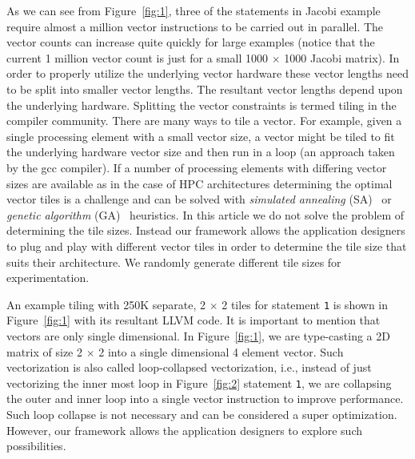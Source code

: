 As we can see from Figure~\ref{fig:1}, three of the statements in Jacobi
example require almost a million vector instructions to be carried out
in parallel. The vector counts can increase quite quickly for large
examples (notice that the current 1 million vector count is just for a
small 1000 $\times$ 1000 Jacobi matrix). In order to properly utilize
the underlying vector hardware these vector lengths need to be split
into smaller vector lengths. The resultant vector lengths depend upon
the underlying hardware. Splitting the vector constraints is termed
tiling in the compiler community. There are many ways to tile a
vector. For example, given a single processing element with a small
vector size, a vector might be tiled to fit the underlying hardware
vector size and then run in a loop (an approach taken by the gcc
compiler). If a number of processing elements with differing vector
sizes are available as in the case of HPC architectures determining the
optimal vector tiles is a challenge and can be solved with
\textit{simulated annealing} (SA)~\cite{tbra01} or \textit{genetic
  algorithm} (GA)~\cite{tbra01} heuristics. In this article we do not
solve the problem of determining the tile sizes. Instead our framework
allows the application designers to plug and play with different vector
tiles in order to determine the tile size that suits their
architecture. We randomly generate different tile sizes for
experimentation.

An example tiling with 250K separate, 2 $\times$ 2 tiles for statement
\texttt{1} is shown in Figure~\ref{fig:1} with its resultant LLVM
code. It is important to mention that vectors are only single
dimensional. In Figure~\ref{fig:1}, we are type-casting a 2D matrix of
size 2 $\times$ 2 into a single dimensional 4 element vector. Such
vectorization is also called loop-collapsed vectorization, i.e., instead
of just vectorizing the inner most loop in Figure~\ref{fig:2} statement
\texttt{1}, we are collapsing the outer and inner loop into a single
vector instruction to improve performance. Such loop collapse is not
necessary and can be considered a super optimization. However, our
framework allows the application designers to explore such
possibilities.



